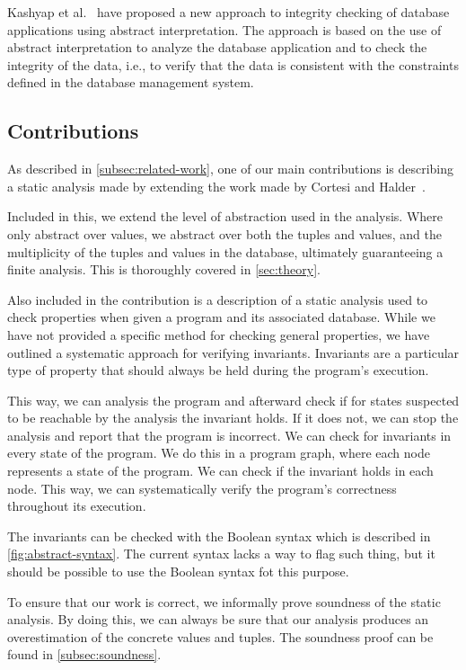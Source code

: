Kashyap et al.~\cite{kashyap_integrity_2022} have proposed a new approach to integrity checking of database applications using abstract interpretation. 
The approach is based on the use of abstract interpretation to analyze the database application and to check the integrity of the data, i.e., to verify that the data is consistent with the constraints defined in the database management system.


\subsection{Contributions}\label{subsec:contributions}
As described in \autoref{subsec:related-work}, one of our main contributions is describing a static analysis made by extending the work made by Cortesi and Halder~\cite{halder_abstract_2012}.

Included in this, we extend the level of abstraction used in the analysis.
Where~\cite{halder_abstract_2012} only abstract over values, we abstract over both the tuples and values, and the multiplicity of the tuples and values in the database, ultimately guaranteeing a finite analysis.
This is thoroughly covered in \autoref{sec:theory}.

Also included in the contribution is a description of a static analysis used to check properties when given a program and its associated database.
While we have not provided a specific method for checking general properties, we have outlined a systematic approach for verifying invariants.
Invariants are a particular type of property that should always be held during the program's execution.

This way, we can analysis the program and afterward check if for states suspected to be reachable by the analysis the invariant holds.
If it does not, we can stop the analysis and report that the program is incorrect.
We can check for invariants in every state of the program.
We do this in a program graph, where each node represents a state of the program.
We can check if the invariant holds in each node.
This way, we can systematically verify the program's correctness throughout its execution.

The invariants can be checked with the Boolean syntax which is described in \autoref{fig:abstract-syntax}.
The current syntax lacks a way to flag such thing, but it should be possible to use the Boolean syntax fot this purpose. 

To ensure that our work is correct, we informally prove soundness of the static analysis.
By doing this, we can always be sure that our analysis produces an overestimation of the concrete values and tuples.
The soundness proof can be found in \autoref{subsec:soundness}.

